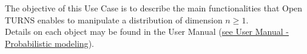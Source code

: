 \renewcommand{\filename}{docUC_InputNoData_DistManipulation.tex}
\renewcommand{\filetitle}{UC : Manipulation of a distribution}

\HeaderIIILevel


\label{manipulation_distribution}





The objective of this Use Case is to describe the main functionalities that Open TURNS enables to manipulate a distribution of dimension $n \geq 1$.\\



Details on each object may be found in the User Manual  (\href{OpenTURNS_UserManual_TUI.pdf}{see User Manual - Probabilistic modeling}).\\


